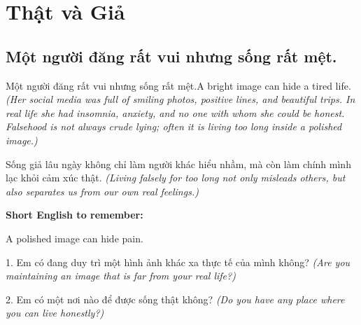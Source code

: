 \chapter{Thật và Giả}

\section{Một người đăng rất vui nhưng sống rất mệt.}
\begin{truyen}{Một người đăng rất vui nhưng sống rất mệt.}{A bright image can hide a tired life.}
\textit{(Her social media was full of smiling photos, positive lines, and beautiful trips. In real life she had insomnia, anxiety, and no one with whom she could be honest. Falsehood is not always crude lying; often it is living too long inside a polished image.)}
\end{truyen}
\begin{baihoc}
Sống giả lâu ngày không chỉ làm người khác hiểu nhầm, mà còn làm chính mình lạc khỏi cảm xúc thật.
\textit{(Living falsely for too long not only misleads others, but also separates us from our own real feelings.)}
\end{baihoc}
\begin{ghinhoanh}
\textbf{Short English to remember:}

A polished image can hide pain.
\end{ghinhoanh}
\begin{tuhocnhanh}
1. Em có đang duy trì một hình ảnh khác xa thực tế của mình không? \textit{(Are you maintaining an image that is far from your real life?)}

2. Em có một nơi nào để được sống thật không? \textit{(Do you have any place where you can live honestly?)}
\end{tuhocnhanh}
\ngancach

